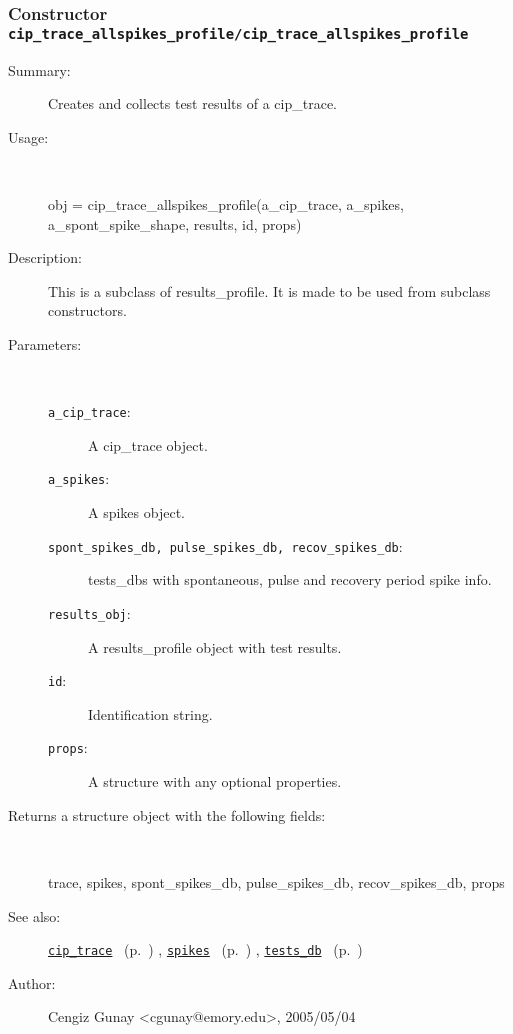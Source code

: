 \subsubsection[Constructor \texttt{cip\_trace\_allspikes\_profile}]{Constructor \texttt{cip\_trace\_allspikes\_profile/cip\_trace\_allspikes\_profile}}%
%
\label{ref_cip_trace_allspikes_profile__cip_trace_allspikes_profile}%
\hypertarget{ref_cip_trace_allspikes_profile__cip_trace_allspikes_profile}{}%
\begin{description}
\item[Summary:]Creates and collects test results of a cip\_trace.
%
\item[Usage:]~%
\begin{lyxcode}%
obj = 
   cip\_trace\_allspikes\_profile(a\_cip\_trace, a\_spikes, a\_spont\_spike\_shape, 
				results, id, props)
%
\end{lyxcode}%
%
\item[Description:]%
This is a subclass of results\_profile. It is made to be used from 
 subclass constructors.
\item[Parameters:]~
\begin{description}%
\item[\texttt{a\_cip\_trace}:]
 A cip\_trace object.
\item[\texttt{a\_spikes}:]
 A spikes object.
\item[\texttt{spont\_spikes\_db, pulse\_spikes\_db, recov\_spikes\_db}:]
 

tests\_dbs with spontaneous, pulse and recovery period spike info.\item[\texttt{results\_obj}:]
 A results\_profile object with test results.
\item[\texttt{id}:]
 Identification string.
\item[\texttt{props}:]
 A structure with any optional properties.
\end{description}%
%
\item[Returns a structure object with the following fields:]~

	trace, spikes, spont\_spikes\_db, 
	pulse\_spikes\_db, recov\_spikes\_db, props
%
%
\item[See also:]%
\hyperlink{ref_cip_trace}{\texttt{cip\_trace}}%
\ (p.~\pageref{ref_cip_trace})%
%
, \hyperlink{ref_spikes}{\texttt{spikes}}%
\ (p.~\pageref{ref_spikes})%
%
, \hyperlink{ref_tests_db}{\texttt{tests\_db}}%
\ (p.~\pageref{ref_tests_db})%
%
%
\item[Author:]%
Cengiz Gunay <cgunay@emory.edu>, 2005/05/04%
\end{description}
\methodline%
